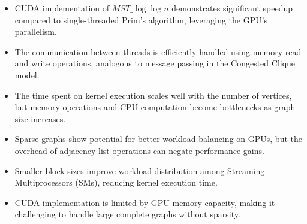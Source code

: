 \documentclass[english, 12pt, a4paper, elec, utf8, a-2b, online]{aaltothesis}
\newcommand{\mstalgo}{$MST\_\log\log{n}$}
\begin{document}
\begin{itemize}
	\item CUDA implementation of \mstalgo{} demonstrates significant speedup compared to single-threaded Prim's algorithm, leveraging the GPU's parallelism.
	\item The communication between threads is efficiently handled using memory read and write operations, analogous to message passing in the Congested Clique model.
	\item The time spent on kernel execution scales well with the number of vertices, but memory operations and CPU computation become bottlenecks as graph size increases.
	\item Sparse graphs show potential for better workload balancing on GPUs, but the overhead of adjacency list operations can negate performance gains.
	\item Smaller block sizes improve workload distribution among Streaming Multiprocessors (SMs), reducing kernel execution time.
	\item CUDA implementation is limited by GPU memory capacity, making it challenging to handle large complete graphs without sparsity.
\end{itemize}







\end{document}
